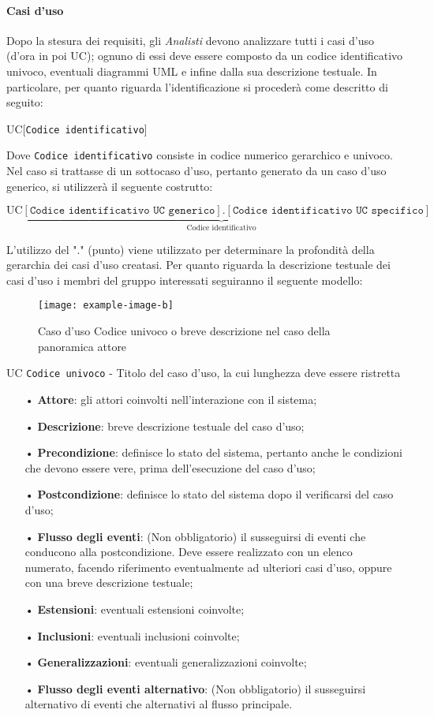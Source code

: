 \paragraph{Casi d'uso}
Dopo la stesura dei requisiti, gli \textit{Analisti} devono analizzare tutti i casi d'uso (d'ora in poi UC); ognuno di essi deve essere composto da un codice identificativo univoco, eventuali diagrammi UML e infine dalla sua descrizione testuale. In particolare, per quanto riguarda l'identificazione si procederà come descritto di seguito:
\begin{center}
UC[\texttt{Codice identificativo}]
\end{center}
Dove \texttt{Codice identificativo} consiste in codice numerico {gerarchico} e univoco.
Nel caso si trattasse di un {sottocaso d'uso}, pertanto generato da un caso d'uso generico, si utilizzerà il seguente costrutto:
\begin{center}
$\text{UC}\underbrace{[\texttt{Codice identificativo UC generico}].[\texttt{Codice identificativo UC specifico}]}_{\text{Codice   identificativo}}$
\end{center}
L'utilizzo del "." (punto) viene utilizzato per determinare la profondità della gerarchia dei casi d'uso creatasi.
Per quanto riguarda la descrizione testuale dei casi d'uso i membri del gruppo interessati seguiranno il seguente modello:
\begin{figure}[H]
\centering
\texttt{[image: example-image-b]}
\caption{Caso d'uso Codice univoco o breve descrizione nel caso della panoramica attore}
\end{figure}
UC \texttt{Codice univoco} - Titolo del caso d'uso, la cui lunghezza deve essere ristretta
\begin{itemize}
\item[•] \textbf{Attore}: gli attori coinvolti nell'interazione con il sistema;
\item[•] \textbf{Descrizione}: breve descrizione testuale del caso d'uso;
\item[•] \textbf{Precondizione}: definisce lo stato del sistema, pertanto anche le condizioni che devono essere vere, prima dell'esecuzione del caso d'uso; 
\item[•] \textbf{Postcondizione}: definisce lo stato del sistema dopo il verificarsi del caso d'uso; 
\item[•] \textbf{Flusso degli eventi}: (Non obbligatorio) il susseguirsi di eventi che conducono alla postcondizione. Deve essere realizzato con un elenco numerato, facendo riferimento eventualmente ad ulteriori casi d'uso, oppure con una breve descrizione testuale;
\item[•] \textbf{Estensioni}: eventuali estensioni coinvolte;
\item[•] \textbf{Inclusioni}: eventuali inclusioni coinvolte;
\item[•] \textbf{Generalizzazioni}: eventuali generalizzazioni coinvolte;
\item[•] \textbf{Flusso degli eventi alternativo}: (Non obbligatorio) il susseguirsi alternativo di eventi che alternativi al flusso principale.
\end{itemize}



